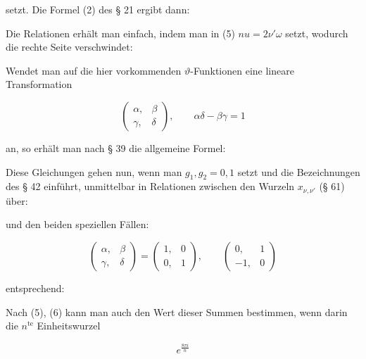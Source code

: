 
setzt. Die Formel (2) des § 21 ergibt dann:


Die  Relationen erhält man einfach, indem man
in (5) $nu = 2\nu'\omega$ setzt, wodurch die rechte Seite verschwindet:


Wendet man auf die hier vorkommenden $\vartheta$-Funktionen eine
lineare Transformation

\[
\begin{pmatrix} \alpha, & \beta \\ \gamma, & \delta \end{pmatrix}, \qquad \alpha\delta - \beta\gamma = 1
\]

an, so erhält man nach § 39 die allgemeine Formel:


Diese Gleichungen gehen nun, wenn man $g_1, g_2 = 0, 1$ setzt
und die Bezeichnungen des § 42 einführt, unmittelbar in Relationen zwischen den Wurzeln $x_{\nu,\nu'}$ (§ 61) über:


und den beiden speziellen Fällen:

\[
\begin{pmatrix} \alpha, & \beta \\ \gamma, & \delta \end{pmatrix} = \begin{pmatrix} 1, & 0 \\ 0, & 1 \end{pmatrix}, \qquad \begin{pmatrix} 0, & 1 \\ -1, & 0 \end{pmatrix}
\]

entsprechend:



Nach (5), (6) kann man auch den Wert dieser Summen bestimmen, wenn darin die $n^{\text{te}}$ Einheitswurzel

\[
e^{\frac{8\pi i}{n}}
\]
